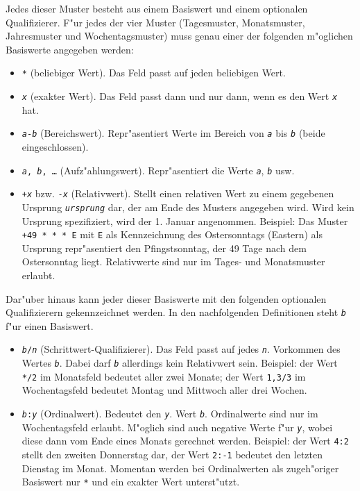\documentclass[a4paper]{article}
\numberwithin{equation}{section}
\begin{document}
Jedes dieser Muster besteht aus einem Basiswert und einem optionalen
Qualifizierer. F"ur jedes der vier Muster (Tagesmuster, Monatsmuster,
Jahresmuster und Wochentagsmuster) muss genau einer der folgenden m"oglichen
Basiswerte angegeben werden:
\begin{itemize}
\item \texttt{*} (beliebiger Wert). Das Feld passt auf jeden beliebigen Wert.
\item \texttt{\textit{x}} (exakter Wert). Das Feld passt dann und nur dann, wenn
  es den Wert \texttt{\textit{x}} hat.
\item \texttt{\textit{a}-\textit{b}} (Bereichswert). Repr"asentiert Werte im
  Bereich von \texttt{\textit{a}} bis \texttt{\textit{b}} (beide
  eingeschlossen).
\item \texttt{\textit{a}, \textit{b}, \ldots} (Aufz"ahlungswert). Repr"asentiert
  die Werte \texttt{\textit{a}}, \texttt{\textit{b}} usw.
\item \texttt{+\textit{x}} bzw. \texttt{-\textit{x}} (Relativwert). Stellt einen
  relativen Wert zu einem gegebenen Ursprung \texttt{\textit{ursprung}} dar, der
  am Ende des Musters angegeben wird. Wird kein Ursprung spezifiziert, wird der
  1. Januar angenommen. Beispiel: Das Muster \texttt{+49 * * * E} mit \texttt{E}
  als Kennzeichnung des Ostersonntags (Eastern) als Ursprung repr"asentiert den
  Pfingstsonntag, der 49 Tage nach dem Ostersonntag liegt. Relativwerte sind nur
  im Tages- und Monatsmuster erlaubt.
\end{itemize}

\noindent Dar"uber hinaus kann jeder dieser Basiswerte mit den folgenden
optionalen Qualifizierern gekennzeichnet werden. In den nachfolgenden
Definitionen steht \texttt{\textit{b}} f"ur einen Basiswert.
\begin{itemize}
\item \texttt{\textit{b}/\textit{n}} (Schrittwert-Qualifizierer). Das Feld passt
  auf jedes \texttt{\textit{n}}. Vorkommen des Wertes \texttt{\textit{b}}. Dabei
  darf \texttt{\textit{b}} allerdings kein Relativwert sein. Beispiel: der Wert
  \texttt{*/2} im Monatsfeld bedeutet aller zwei Monate; der Wert \texttt{1,3/3}
  im Wochentagsfeld bedeutet Montag und Mittwoch aller drei Wochen.
\item \texttt{\textit{b}:\textit{y}} (Ordinalwert). Bedeutet den
  \texttt{\textit{y}}. Wert \texttt{\textit{b}}. Ordinalwerte sind nur im
  Wochentagsfeld erlaubt. M"oglich sind auch negative Werte f"ur
  \texttt{\textit{y}}, wobei diese dann vom Ende eines Monats gerechnet werden.
  Beispiel: der Wert \texttt{4:2} stellt den zweiten Donnerstag dar, der Wert
  \texttt{2:-1} bedeutet den letzten Dienstag im Monat. Momentan werden bei
  Ordinalwerten als zugeh"origer Basiswert nur \texttt{*} und ein exakter Wert
  unterst"utzt.
\end{itemize}
\end{document}
